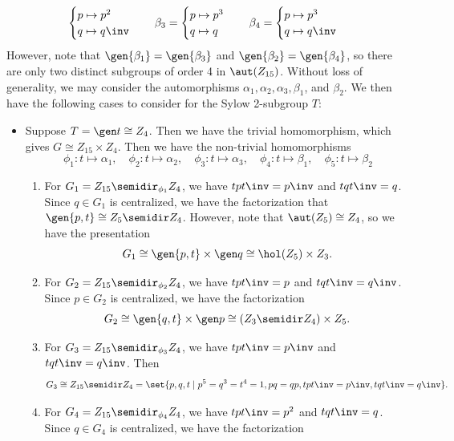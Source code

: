 \begin{solalph}
\[\begin{cases}
        p \mapsto p^2 \\
        q \mapsto q\inv
    \end{cases} \quad
    \beta_3 =
    \begin{cases}
        p \mapsto p^3 \\
        q \mapsto q
    \end{cases} \quad
    \beta_4 =
    \begin{cases}
        p \mapsto p^3 \\
        q \mapsto q\inv
    \end{cases}\]
    However, note that $\gen{\beta_1} = \gen{\beta_3}$ and $\gen{\beta_2} = \gen{\beta_4}$, so there are only two distinct subgroups of order 4 in $\aut(Z_{15})$. Without loss of generality, we may consider the automorphisms $\alpha_1, \alpha_2, \alpha_3, \beta_1$, and $\beta_2$. We then have the following cases to consider for the Sylow 2-subgroup $T$:
    \begin{itemize}
        \item Suppose $T = \gen t \cong Z_4$. Then we have the trivial homomorphism, which gives $G \cong Z_{15} \times Z_4$. Then we have the non-trivial homomorphisms
        \[\phi_1 : t \mapsto \alpha_1, \quad \phi_2 : t \mapsto \alpha_2, \quad \phi_3 : t \mapsto \alpha_3, \quad \phi_4 : t \mapsto \beta_1, \quad \phi_5 : t \mapsto \beta_2\]
        \begin{enumerate}
            \item For $G_1 = Z_{15} \semidir_{\phi_1} Z_4$, we have $tpt\inv = p\inv$ and $tqt\inv = q$. Since $q \in G_1$ is centralized, we have the factorization that $\gen{p, t} \cong Z_5 \semidir Z_4$. However, note that $\aut(Z_5) \cong Z_4$, so we have the presentation
            \[G_1 \cong \gen{p, t} \times \gen q \cong \hol(Z_5) \times Z_3.\]
            \item For $G_2 = Z_{15} \semidir_{\phi_2} Z_4$, we have $tpt\inv = p$ and $tqt\inv = q\inv$. Since $p \in G_2$ is centralized, we have the factorization
            \[G_2 \cong \gen{q, t} \times \gen p \cong (Z_3 \semidir Z_4) \times Z_5.\]
            \item For $G_3 = Z_{15} \semidir_{\phi_3} Z_4$, we have $tpt\inv = p\inv$ and $tqt\inv = q\inv$. Then
            \[G_3 \cong Z_{15} \semidir Z_4 = \set{p, q, t \mid p^5 = q^3 = t^4 = 1, pq = qp, tpt\inv = p\inv, tqt\inv = q\inv}.\]
            \item For $G_4 = Z_{15} \semidir_{\phi_4} Z_4$, we have $tpt\inv = p^2$ and $tqt\inv = q$. Since $q \in G_4$ is centralized, we have the factorization

\end{enumerate}
\end{itemize}
\end{solalph}
